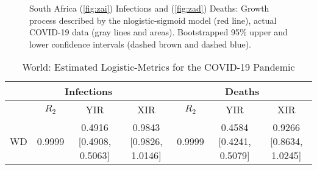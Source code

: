 \documentclass[journal]{IEEEtran}
\theoremstyle{plain}
\theoremstyle{definition}
\theoremstyle{remark}
\begin{document}
\begin{figure}[t]
	\centering
	\quad
	
	\caption{South Africa (\ref{fig:zai}) Infections and (\ref{fig:zad}) Deaths: Growth process described by the nlogistic-sigmoid model (red line), actual COVID-19 data (gray lines and areas). Bootstrapped 95\% upper and lower confidence intervals (dashed brown and dashed blue).}
	\label{fig:za}
\end{figure}
















\begin{table*}[t]
	\caption{World: Estimated Logistic-Metrics for the COVID-19 Pandemic}
	\centering
	\def\arraystretch{1.5}\begin{tabular}{|c|c|c|c|c|c|c|}
		\hline
		\multicolumn{4}{|c||}{Infections}&
		\multicolumn{3}{c|}{Deaths}\\
		\hline\hline
			 & $R_2$ & YIR & XIR & $R_2$ & YIR & XIR \\
		\hline\hline
WD&0.9999&	0.4916 [0.4908, 0.5063]& 0.9843 [0.9826, 1.0146]&	
0.9999&	0.4584 [0.4241, 0.5079]& 0.9266 [0.8634, 1.0245]\\	
\hline
\end{tabular}
\label{table_wd}
\end{table*}
\end{document}
